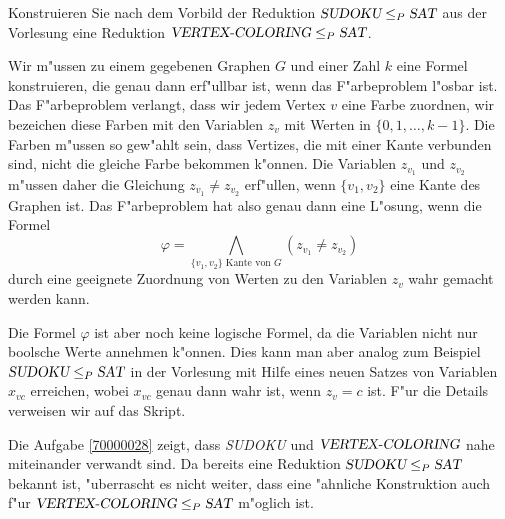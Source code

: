 Konstruieren Sie nach dem Vorbild der Reduktion
$\textsl{SUDOKU}\le_P\textsl{SAT}$ aus der Vorlesung eine
Reduktion
$\textsl{VERTEX-COLORING}\le_P\textsl{SAT}$.

\begin{loesung}
Wir m"ussen zu einem gegebenen Graphen $G$ und einer Zahl $k$ eine
Formel konstruieren, die genau dann erf"ullbar ist, wenn das F"arbeproblem
l"osbar ist. Das F"arbeproblem verlangt, dass wir jedem Vertex $v$ eine
Farbe zuordnen, wir bezeichen diese Farben mit den Variablen $z_v$
mit Werten in $\{0,1,\dots,k-1\}$.
Die Farben m"ussen so gew"ahlt sein, dass Vertizes, die mit einer Kante
verbunden sind, nicht die gleiche Farbe bekommen k"onnen. Die Variablen
$z_{v_1}$ und $z_{v_2}$ m"ussen daher die Gleichung $z_{v_1}\ne z_{v_2}$
erf"ullen, wenn $\{v_1,v_2\}$ eine Kante des Graphen ist. Das F"arbeproblem
hat also genau dann eine L"osung, wenn die Formel
\[
\varphi =\bigwedge_{\text{$\{v_1,v_2\}$ Kante von $G$}} (z_{v_1}\ne z_{v_2})
\]
durch eine geeignete Zuordnung von Werten zu den Variablen $z_v$ wahr gemacht
werden kann.

Die Formel $\varphi$ ist aber noch keine logische Formel, da die Variablen
nicht nur boolsche Werte annehmen k"onnen.
Dies kann man aber analog zum Beispiel $\textsl{SUDOKU}\le_P\textsl{SAT}$
in der Vorlesung mit Hilfe eines neuen Satzes von Variablen $x_{vc}$
erreichen, wobei $x_{vc}$ genau dann wahr ist, wenn $z_v=c$ ist.
F"ur die Details verweisen wir auf das Skript.
\end{loesung}

\begin{diskussion}
Die Aufgabe \ref{70000028} zeigt, dass \textsl{SUDOKU} und 
$\textsl{VERTEX-COLORING}$ nahe miteinander verwandt sind.
Da bereits eine Reduktion $\textsl{SUDOKU}\le_P\textsl{SAT}$
bekannt ist, "uberrascht es nicht weiter, dass eine "ahnliche
Konstruktion auch f"ur
$\textsl{VERTEX-COLORING}\le_P\textsl{SAT}$
m"oglich ist.
\end{diskussion}


